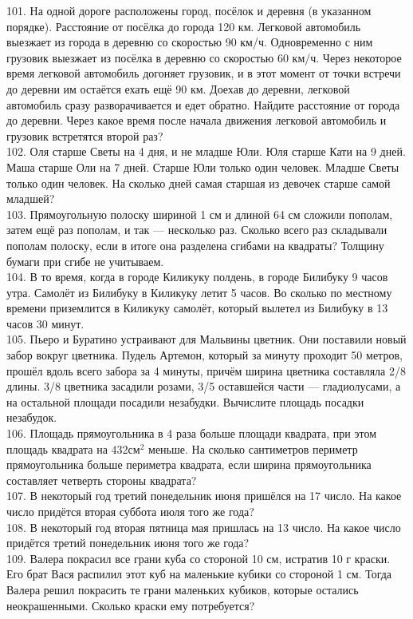 \documentclass[12pt]{article}
\begin{document}
101. На одной дороге расположены город, посёлок и деревня (в указанном порядке). Расстояние от посёлка до города 120 км. Легковой автомобиль выезжает из города в деревню со скоростью 90 км/ч. Одновременно с ним грузовик выезжает из посёлка в деревню со скоростью 60 км/ч. Через некоторое время легковой автомобиль догоняет грузовик, и в этот момент от точки встречи до деревни им остаётся ехать ещё 90 км. Доехав до деревни, легковой автомобиль сразу разворачивается и едет обратно. Найдите расстояние от города до деревни. Через какое время после начала движения легковой автомобиль и грузовик встретятся второй раз?\\
102. Оля старше Светы на 4 дня, и не младше Юли. Юля старше Кати на 9 дней. Маша старше Оли на 7 дней. Старше Юли только один человек. Младше Светы только один человек. На сколько дней самая старшая из девочек старше самой младшей?\\
103. Прямоугольную полоску шириной 1 см и длиной 64 см сложили пополам, затем ещё раз пополам, и так --- несколько раз. Сколько всего раз складывали пополам полоску, если в итоге она разделена сгибами на квадраты? Толщину бумаги при сгибе не учитываем.\\
104. В то время, когда в городе Киликуку полдень, в городе Билибуку 9 часов утра. Самолёт из Билибуку в Киликуку летит 5 часов. Во сколько по местному времени приземлится в Киликуку самолёт, который вылетел из Билибуку в 13 часов 30 минут.\\
105. Пьеро и Буратино устраивают для Мальвины цветник. Они поставили новый забор вокруг цветника. Пудель Артемон, который за минуту проходит 50 метров, прошёл вдоль всего забора за 4 минуты, причём ширина цветника составляла 2/8 длины. 3/8 цветника засадили розами, 3/5 оставшейся части --- гладиолусами, а на остальной площади посадили незабудки. Вычислите площадь посадки незабудок.\\
106. Площадь прямоугольника в 4 раза больше площади квадрата, при этом площадь квадрата на $432\text{см}^2$ меньше. На сколько сантиметров периметр прямоугольника больше периметра квадрата, если ширина прямоугольника составляет четверть стороны квадрата?\\
107. В некоторый год третий понедельник июня пришёлся на 17 число. На какое число придётся вторая суббота июля того же года?\\
108. В некоторый год вторая пятница мая пришлась на 13 число. На какое число придётся третий понедельник июня того же года?\\
109. Валера покрасил все грани куба со стороной 10 см, истратив 10 г краски. Его брат Вася распилил этот куб на маленькие кубики со стороной 1 см. Тогда Валера решил покрасить те грани маленьких кубиков, которые остались неокрашенными. Сколько краски ему потребуется?\\
\end{document}
